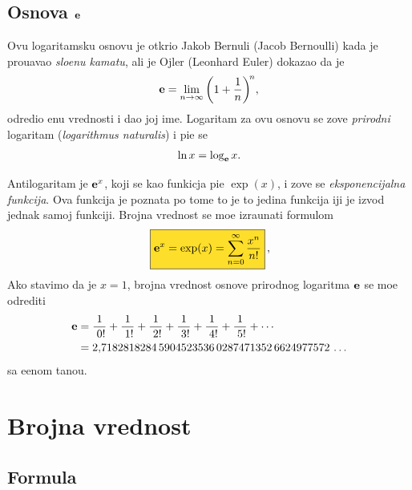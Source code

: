 \documentclass[12pt, twoside, a4paper]{article}
\def\.{{,}}
\def\e{{\bf e}}
\begin{document}

\subsection{Osnova $\e$}

Ovu logaritamsku osnovu je otkrio Jakob Bernuli (Jacob Bernoulli) kada je
prou{\cv}avao {\sl slo{\zv}enu kamatu}, ali je Ojler (Leonhard Euler) dokazao da je
$$
\e=\lim_{n\to\infty}\left(1+{1\over n}\right)^{\!n}\!,
$$
odredio {\nj}enu vrednosti i dao joj ime.
Logaritam za ovu osnovu se zove {\sl prirodni\/} logaritam ({\sl logarithmus naturalis\/})
i pi{\sv}e se
$$
\ln x=\log_\e x.
$$

\def\ep{\hphantom{!}}
Antilogaritam je $\e^x$, koji se kao funkicja pi{\sv}e $\exp(x)$, i zove se
{\sl eksponencijalna funkcija}. Ova funkcija je poznata po tome {\sv}to je to 
jedina funkcija {\cv}iji je izvod jednak samoj funkciji. Brojna vrednost se mo{\zv}e
izra{\cv}unati formulom
\begin{equation}
\label{eq:exp}
\okvir{\e^x=\exp(x)=\sum_{n=0}^\infty{x^n\over n!}},
\end{equation}
Ako stavimo da je $x=1$,
brojna vrednost osnove prirodnog logaritma $\e$ se mo{\zv}e odrediti
\begin{equation}
\label{eq:e}
\begin{aligned}
\e
&={1\over\ep0!}+{1\over\ep1!}+{1\over\ep2!}+{1\over\ep3!}+{1\over\ep4!}+{1\over\ep5!}+\cdots\\
&=2\.
7182818284\,
5904523536\,
0287471352\,
6624977572\,\ldots
\end{aligned}
\end{equation}
sa {\zv}e{\lj}enom ta{\cv}no{\sv}{\cc}u.


\section{Brojna vrednost}

\subsection{Formula}
\end{document}

